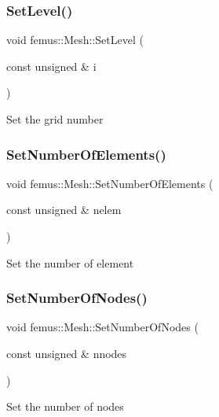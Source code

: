 \subsubsection{\texorpdfstring{Set\+Level()}{SetLevel()}}
{\footnotesize\ttfamily void femus\+::\+Mesh\+::\+Set\+Level (\begin{DoxyParamCaption}\item[{const unsigned \&}]{i }\end{DoxyParamCaption})\hspace{0.3cm}{\ttfamily [inline]}}

Set the grid number \mbox{\label{classfemus_1_1_mesh_ac3c20a1d205b9f0aff0abb34d5de6d4c}} 
\subsubsection{\texorpdfstring{Set\+Number\+Of\+Elements()}{SetNumberOfElements()}}
{\footnotesize\ttfamily void femus\+::\+Mesh\+::\+Set\+Number\+Of\+Elements (\begin{DoxyParamCaption}\item[{const unsigned \&}]{nelem }\end{DoxyParamCaption})\hspace{0.3cm}{\ttfamily [inline]}}

Set the number of element \mbox{\label{classfemus_1_1_mesh_aa55f34434829bad6e0fed904a40f271c}} 
\subsubsection{\texorpdfstring{Set\+Number\+Of\+Nodes()}{SetNumberOfNodes()}}
{\footnotesize\ttfamily void femus\+::\+Mesh\+::\+Set\+Number\+Of\+Nodes (\begin{DoxyParamCaption}\item[{const unsigned \&}]{nnodes }\end{DoxyParamCaption})\hspace{0.3cm}{\ttfamily [inline]}}

Set the number of nodes 

